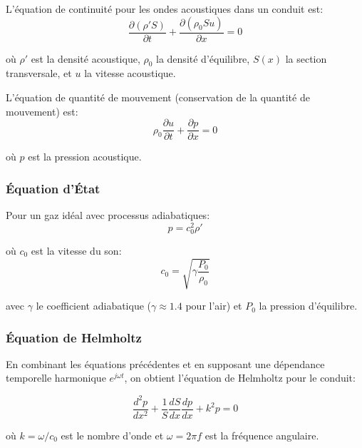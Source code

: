 \documentclass[12pt,a4paper,twocolumn]{article}
\begin{document}
L'équation de continuité pour les ondes acoustiques dans un conduit est:
\begin{equation}
\frac{\partial (\rho' S)}{\partial t} + \frac{\partial (\rho_0 S u)}{\partial x} = 0
\label{eq:continuite}
\end{equation}

où $\rho'$ est la densité acoustique, $\rho_0$ la densité d'équilibre, $S(x)$ la section transversale, et $u$ la vitesse acoustique.

L'équation de quantité de mouvement (conservation de la quantité de mouvement) est:
\begin{equation}
\rho_0 \frac{\partial u}{\partial t} + \frac{\partial p}{\partial x} = 0
\label{eq:quantite_mouvement}
\end{equation}

où $p$ est la pression acoustique.

\subsubsection{Équation d'État}

Pour un gaz idéal avec processus adiabatiques:
\begin{equation}
p = c_0^2 \rho'
\label{eq:etat}
\end{equation}

où $c_0$ est la vitesse du son:
\begin{equation}
c_0 = \sqrt{\gamma \frac{P_0}{\rho_0}}
\label{eq:vitesse_son}
\end{equation}

avec $\gamma$ le coefficient adiabatique ($\gamma \approx 1.4$ pour l'air) et $P_0$ la pression d'équilibre.

\subsubsection{Équation de Helmholtz}

En combinant les équations précédentes et en supposant une dépendance temporelle harmonique $e^{j\omega t}$, on obtient l'équation de Helmholtz pour le conduit:

\begin{equation}
\frac{d^2 p}{dx^2} + \frac{1}{S}\frac{dS}{dx}\frac{dp}{dx} + k^2 p = 0
\label{eq:helmholtz}
\end{equation}

où $k = \omega/c_0$ est le nombre d'onde et $\omega = 2\pi f$ est la fréquence angulaire.
\end{document}
